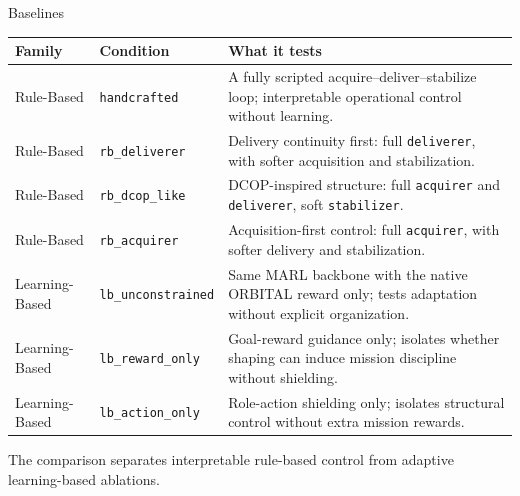 \documentclass[aspectratio=169]{beamer}
\begin{document}
\begin{frame}{Baselines}

  \tiny
  \vfill
  \begin{center}
    \setlength{\tabcolsep}{3pt}
    \renewcommand{\arraystretch}{1.3}
    \begin{tabularx}{0.96\linewidth}{p{2.55cm} p{2.85cm} X}
      \toprule
      Family & Condition                                                                                               & What it tests \\
      \midrule
      Rule-Based
             & \texttt{handcrafted}
             & A fully scripted acquire--deliver--stabilize loop; interpretable operational control without learning.                  \\
      Rule-Based
             & \texttt{rb\_deliverer}
             & Delivery continuity first: full \texttt{deliverer}, with softer acquisition and stabilization.                          \\
      Rule-Based
             & \texttt{rb\_dcop\_like}
             & DCOP-inspired structure: full \texttt{acquirer} and \texttt{deliverer}, soft \texttt{stabilizer}.                       \\
      Rule-Based
             & \texttt{rb\_acquirer}
             & Acquisition-first control: full \texttt{acquirer}, with softer delivery and stabilization.                              \\
      Learning-Based
             & \texttt{lb\_unconstrained}
             & Same MARL backbone with the native ORBITAL reward only; tests adaptation without explicit organization.                 \\
      Learning-Based
             & \texttt{lb\_reward\_only}
             & Goal-reward guidance only; isolates whether shaping can induce mission discipline without shielding.                    \\
      Learning-Based
             & \texttt{lb\_action\_only}
             & Role-action shielding only; isolates structural control without extra mission rewards.                                  \\
      \bottomrule
    \end{tabularx}

    \vspace{0.16cm}
    \small
    The comparison separates interpretable rule-based control from adaptive learning-based ablations.
  \end{center}
  \vfill

\end{frame}
\end{document}
